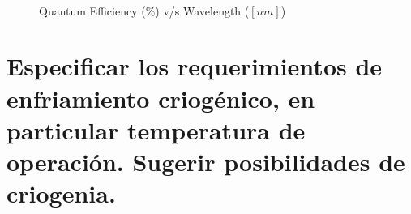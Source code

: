 \documentclass[a4paper,10pt]{article}
\begin{document}
\begin{figure}[ht!]
  \centering
  ~ 
  \caption{Quantum Efficiency (\%) v/s Wavelength ($[nm]$)}
  \label{fig:p4}
\end{figure}

\section{Especificar los requerimientos de enfriamiento criogénico, en particular
temperatura de operación. Sugerir posibilidades de criogenia.}
\end{document}
